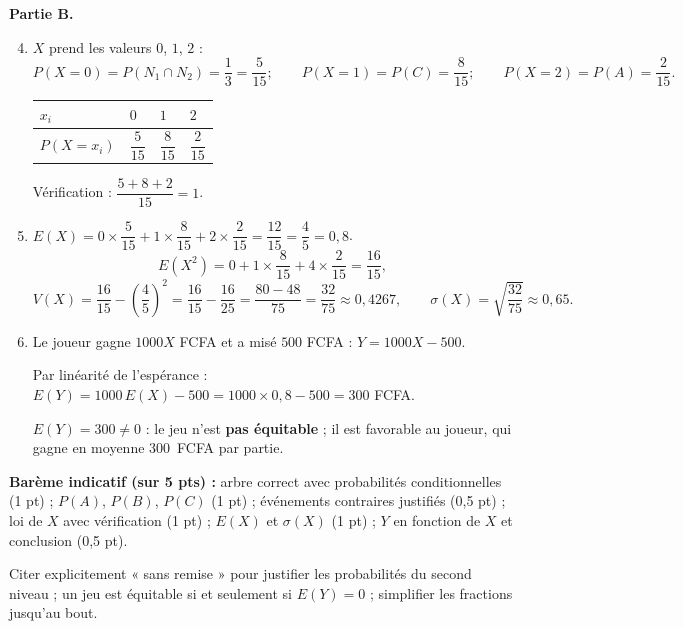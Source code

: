 \documentclass[11pt]{article}
\begin{document}
\begin{corrige}
\textbf{Partie B.}
\begin{enumerate}
\setcounter{enumi}{3}
\item $X$ prend les valeurs $0$, $1$, $2$ :
\[P(X=0)=P(N_1\cap N_2)=\dfrac{1}{3}=\dfrac{5}{15} ;\qquad P(X=1)=P(C)=\dfrac{8}{15} ;\qquad P(X=2)=P(A)=\dfrac{2}{15}.\]
\begin{center}
\begin{tabularx}{\linewidth}{|l|X|X|X|}
\hline
\rowcolor{popblueL} $x_i$ & $0$ & $1$ & $2$ \\
\hline
$P(X=x_i)$ & $\dfrac{5}{15}$ & $\dfrac{8}{15}$ & $\dfrac{2}{15}$ \\
\hline
\end{tabularx}
\end{center}
Vérification : $\dfrac{5+8+2}{15}=1$.
\item $E(X)=0\times\dfrac{5}{15}+1\times\dfrac{8}{15}+2\times\dfrac{2}{15}=\dfrac{12}{15}=\dfrac{4}{5}=0{,}8$.
\[E(X^2)=0+1\times\dfrac{8}{15}+4\times\dfrac{2}{15}=\dfrac{16}{15},\]
\[V(X)=\dfrac{16}{15}-\left(\dfrac{4}{5}\right)^2=\dfrac{16}{15}-\dfrac{16}{25}=\dfrac{80-48}{75}=\dfrac{32}{75}\approx 0{,}4267,\qquad \sigma(X)=\sqrt{\dfrac{32}{75}}\approx 0{,}65.\]
\item Le joueur gagne $1000X$ FCFA et a misé $500$ FCFA : $Y=1000X-500$.

Par linéarité de l'espérance : $E(Y)=1000\,E(X)-500=1000\times 0{,}8-500=300$ FCFA.

$E(Y)=300\ne 0$ : le jeu n'est \textbf{pas équitable} ; il est favorable au joueur, qui gagne en moyenne \SI{300}{FCFA} par partie.
\end{enumerate}
\textbf{Barème indicatif (sur 5 pts) :} arbre correct avec probabilités conditionnelles (1 pt) ; $P(A)$, $P(B)$, $P(C)$ (1 pt) ; événements contraires justifiés (0,5 pt) ; loi de $X$ avec vérification (1 pt) ; $E(X)$ et $\sigma(X)$ (1 pt) ; $Y$ en fonction de $X$ et conclusion (0,5 pt).

\begin{attention}
Citer explicitement « sans remise » pour justifier les probabilités du second niveau ; un jeu est équitable si et seulement si $E(Y)=0$ ; simplifier les fractions jusqu'au bout.
\end{attention}
\end{corrige}
\end{document}
